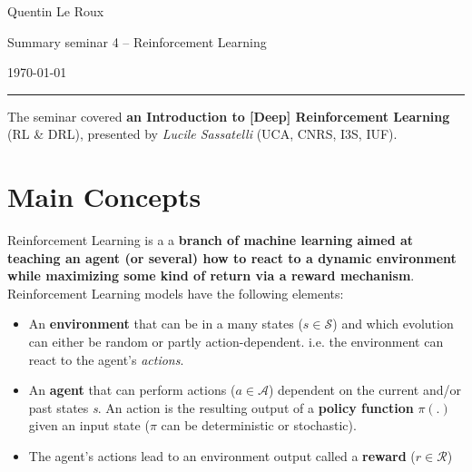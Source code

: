 \documentclass[a4paper, 10pt]{article}
\begin{document}

\fancyhead[C]{}
\begin{minipage}{0.24\textwidth} 
\raggedright
\footnotesize
Quentin Le Roux \hfill
\end{minipage}
\begin{minipage}{0.5\textwidth} 
\centering 
\begin{center}
    Summary seminar 4 -- Reinforcement Learning
\end{center}
\end{minipage}
\begin{minipage}{0.245\textwidth} 
\raggedleft
\today
\end{minipage}
\hrule 
\bigskip


The seminar covered \textbf{an Introduction to [Deep] Reinforcement Learning} (RL \& DRL), presented by \textit{Lucile Sassatelli} (UCA, CNRS, I3S, IUF).

\section{Main Concepts}
Reinforcement Learning is a a \textbf{branch of machine learning aimed at teaching an agent (or several) how to react to a dynamic environment while maximizing some kind of return via a reward mechanism}. Reinforcement Learning models have the following elements:
\begin{itemize}
\item An \textbf{environment} that can be in a many states ($s \in \mathcal{S}$) and which evolution can either be random or partly action-dependent. i.e. the environment can react to the agent's \textit{actions}.
  \item An \textbf{agent} that can perform actions ($a \in \mathcal{A}$) dependent on the current and/or past states \textit{s}. An action is the resulting output of a \textbf{policy function} $\pi(.)$ given an input state ($\pi$ can be deterministic or stochastic).
  \item The agent's actions lead to an environment output called a \textbf{reward} ($r\in\mathcal{R}$)
\end{itemize}
\end{document}
